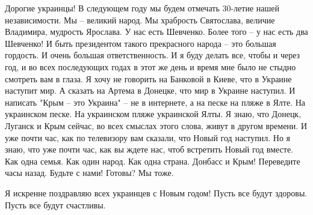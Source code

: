 Дорогие украинцы! В следующем году мы будем отмечать 30-летие нашей
независимости. Мы – великий народ. Мы храбрость Святослава, величие Владимира,
мудрость Ярослава. У нас есть Шевченко. Более того – у нас есть два Шевченко! И
быть президентом такого прекрасного народа – это большая гордость. И очень
большая ответственность. И я буду делать все, чтобы и через год, и во всех
последующих годах в этот же день и время мне было не стыдно смотреть вам в
глаза. Я хочу не говорить на Банковой в Киеве, что в Украине наступит мир. А
сказать на Артема в Донецке, что мир в Украине наступил. И написать "Крым – это
Украина" – не в интернете, а на песке на пляже в Ялте. На украинском песке. На
украинском пляже украинской Ялты. Я знаю, что Донецк, Луганск и Крым сейчас, во
всех смыслах этого слова, живут в другом времени. И уже почти час, как по
телевизору вам сказали, что Новый год наступил. Но я знаю, что уже почти час,
как вы ждете нас, чтоб встретить Новый год вместе. Как одна семья. Как один
народ. Как одна страна. Донбасс и Крым! Переведите часы назад. Будьте с нами!
Готовы? Мы тоже.

Я искренне поздравляю всех украинцев с Новым годом! Пусть все будут здоровы.
Пусть все будут счастливы.

